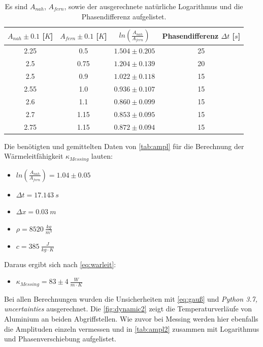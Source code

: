 \begin{table}[htbp]
    \centering
    \caption{Es sind $A_{nah}$, $A_{fern}$, sowie der ausgerechnete natürliche Logarithmus und die Phasendifferenz aufgelistet.}
    \label{tab:ampl}
    \begin{tabular}{c|c|c|c}
        \toprule
        $A_{nah}\pm 0.1$ [$K$] & $A_{fern}\pm 0.1$ [$K$] & $ln(\frac{A_{nah}}{A_{fern}})$ & Phasendifferenz $\Delta t$ [$s$]\\
        \midrule
        2.25 & 0.5 & $1.504\pm 0.205$ & 25\\
        2.5 & 0.75 & $1.204\pm 0.139$ & 20\\
        2.5 & 0.9 & $1.022\pm 0.118$ & 15\\
        2.55 & 1.0 & $0.936\pm 0.107$ & 15\\
        2.6 & 1.1 & $0.860\pm 0.099$ & 15\\
        2.7 & 1.15 & $0.853\pm 0.095$ & 15\\
        2.75 & 1.15 & $0.872\pm 0.094$ & 15\\
        \bottomrule
    \end{tabular}
\end{table}
\newpage
Die benötigten und gemittelten Daten von \autoref{tab:ampl} für die Berechnung der Wärmeleitfähigkeit $\kappa_{Messing}$ lauten:

\begin{itemize}
    \centering
    \item[] $ln(\frac{A_{nah}}{A_{fern}}) = 1.04\pm 0.05$ 
    \item[] $\Delta t = 17.143\ s$
    \item[] $\Delta x = 0.03\ m$
    \item[] $\rho = 8520\ \frac{kg}{m^3}$
    \item[] $c = 385\ \frac{J}{kg\cdot K}$
\end{itemize}

Daraus ergibt sich nach \autoref{eq:warleit}:
\begin{itemize}
    \item[] $\kappa_{Messing} = 83\pm 4\ \frac{W}{m\cdot K}$ 
\end{itemize}

Bei allen Berechnungen wurden die Unsicherheiten mit \autoref{eq:gauß} und \textit{Python 3.7, uncertainties} ausgerechnet.
\newpage
Die \autoref{fig:dynamic2} zeigt die Temperaturverläufe von Aluminium an beiden Abgriffstellen.
Wie zuvor bei Messing werden hier ebenfalls die Amplituden einzeln vermessen und in \autoref{tab:ampl2} zusammen mit Logarithmus und Phasenverschiebung aufgelistet.

